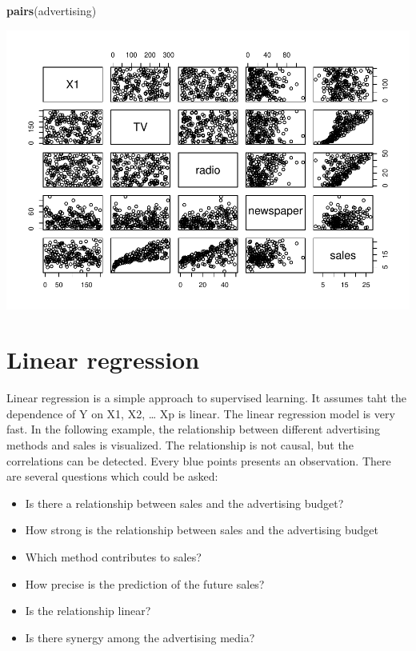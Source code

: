 \documentclass[]{report}
\newenvironment{Shaded}{\begin{snugshade}}{\end{snugshade}}
\newcommand{\KeywordTok}[1]{\textcolor[rgb]{0.13,0.29,0.53}{\textbf{#1}}}
\newcommand{\NormalTok}[1]{#1}
\providecommand{\tightlist}{%
  \setlength{\itemsep}{0pt}\setlength{\parskip}{0pt}}
\begin{document}
\begin{Shaded}
\begin{Highlighting}[]
\KeywordTok{pairs}\NormalTok{(advertising)}
\end{Highlighting}
\end{Shaded}

\includegraphics{MyBook_files/figure-latex/unnamed-chunk-72-1.pdf}

\section{Linear regression}\label{linear-regression}

Linear regression is a simple approach to supervised learning. It
assumes taht the dependence of Y on X1, X2, \ldots{} Xp is linear. The
linear regression model is very fast. In the following example, the
relationship between different advertising methods and sales is
visualized. The relationship is not causal, but the correlations can be
detected. Every blue points presents an observation. There are several
questions which could be asked:

\begin{itemize}
\tightlist
\item
  Is there a relationship between sales and the advertising budget?
\item
  How strong is the relationship between sales and the advertising
  budget
\item
  Which method contributes to sales?
\item
  How precise is the prediction of the future sales?
\item
  Is the relationship linear?
\item
  Is there synergy among the advertising media?
\end{itemize}
\end{document}
